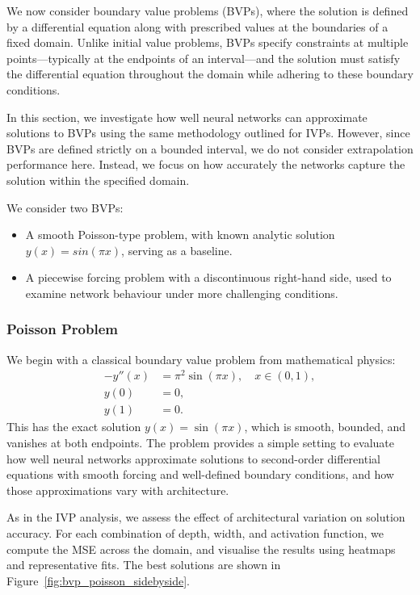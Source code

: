 We now consider boundary value problems (BVPs), where the solution is defined by a 
differential equation along with prescribed values at the boundaries of a fixed domain. Unlike 
initial value problems, BVPs specify constraints at multiple points—typically at the endpoints of 
an interval—and the solution must satisfy the differential equation throughout the domain while 
adhering to these boundary conditions.

In this section, we investigate how well neural networks can approximate solutions to BVPs using 
the same methodology outlined for IVPs. However, since BVPs are defined strictly on a bounded 
interval, we do not consider extrapolation performance here. Instead, we focus on how accurately 
the networks capture the solution within the specified domain.

We consider two BVPs:
\begin{itemize}
    \item A smooth Poisson-type problem, with known analytic solution $y(x)=sin(\pi x)$, 
    serving as a baseline. 
    \item A piecewise forcing problem with a discontinuous right-hand side, used to examine network
     behaviour under more challenging conditions. 
\end{itemize}




\subsubsection{Poisson Problem}

We begin with a classical boundary value problem from mathematical physics:
\[
\begin{aligned}
    -y''(x) &= \pi^2 \sin(\pi x), \quad x \in (0, 1), \\
    y(0) &= 0, \\
    y(1) &= 0.
\end{aligned}
\]
This has the exact solution \( y(x) = \sin(\pi x) \), which is smooth, bounded, and vanishes at both 
endpoints. The problem provides a simple setting to evaluate how well neural networks approximate 
solutions to second-order differential equations with smooth forcing and well-defined boundary 
conditions, and how those approximations vary with architecture.

As in the IVP analysis, we assess the effect of architectural variation on solution accuracy.
For each combination of depth, width, and activation function, we compute the MSE across the domain,
and visualise the results using heatmaps and representative fits. The best solutions are shown in 
Figure~\ref{fig:bvp_poisson_sidebyside}.

